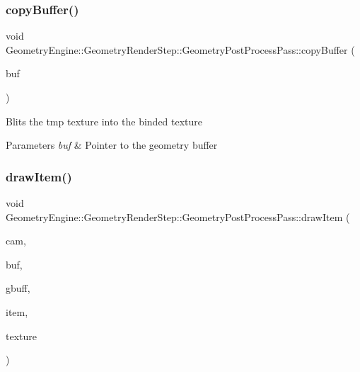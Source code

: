 \subsubsection{\texorpdfstring{copyBuffer()}{copyBuffer()}}
{\footnotesize\ttfamily void Geometry\+Engine\+::\+Geometry\+Render\+Step\+::\+Geometry\+Post\+Process\+Pass\+::copy\+Buffer (\begin{DoxyParamCaption}\item[{\mbox{\hyperlink{class_geometry_engine_1_1_geometry_buffer_1_1_g_buffer}{Geometry\+Buffer\+::\+G\+Buffer}} $\ast$}]{buf }\end{DoxyParamCaption})\hspace{0.3cm}{\ttfamily [protected]}}

Blits the tmp texture into the binded texture 
\begin{DoxyParams}{Parameters}
{\em buf} & Pointer to the geometry buffer \\
\hline
\end{DoxyParams}
\mbox{\label{class_geometry_engine_1_1_geometry_render_step_1_1_geometry_post_process_pass_abee226b3176579ecd5a91022e8b9b26e}} 
\subsubsection{\texorpdfstring{drawItem()}{drawItem()}}
{\footnotesize\ttfamily void Geometry\+Engine\+::\+Geometry\+Render\+Step\+::\+Geometry\+Post\+Process\+Pass\+::draw\+Item (\begin{DoxyParamCaption}\item[{\mbox{\hyperlink{class_geometry_engine_1_1_geometry_world_item_1_1_geometry_camera_1_1_camera}{Geometry\+World\+Item\+::\+Geometry\+Camera\+::\+Camera}} $\ast$}]{cam,  }\item[{\mbox{\hyperlink{class_geometry_engine_1_1_geometry_buffer_1_1_g_buffer}{Geometry\+Buffer\+::\+G\+Buffer}} $\ast$}]{buf,  }\item[{const \mbox{\hyperlink{class_geometry_engine_1_1_g_buffer_texture_info}{G\+Buffer\+Texture\+Info}} \&}]{gbuff,  }\item[{\mbox{\hyperlink{class_geometry_engine_1_1_geometry_world_item_1_1_geometry_item_1_1_geometry_item}{Geometry\+World\+Item\+::\+Geometry\+Item\+::\+Geometry\+Item}} $\ast$}]{item,  }\item[{const \mbox{\hyperlink{class_geometry_engine_1_1_geometry_buffer_1_1_g_buffer_a718dceafcac1915f7de061108597e1cc}{Geometry\+Buffer\+::\+G\+Buffer\+::\+G\+B\+U\+F\+F\+E\+R\+\_\+\+T\+E\+X\+T\+U\+R\+E\+\_\+\+T\+Y\+PE}} \&}]{texture }\end{DoxyParamCaption})\hspace{0.3cm}{\ttfamily [protected]}}

